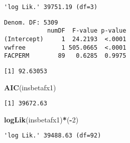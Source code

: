 \documentclass[]{book}
\newenvironment{Shaded}{\begin{snugshade}}{\end{snugshade}}
\newcommand{\CommentTok}[1]{\textcolor[rgb]{0.56,0.35,0.01}{\textit{#1}}}
\newcommand{\DataTypeTok}[1]{\textcolor[rgb]{0.13,0.29,0.53}{#1}}
\newcommand{\DecValTok}[1]{\textcolor[rgb]{0.00,0.00,0.81}{#1}}
\newcommand{\KeywordTok}[1]{\textcolor[rgb]{0.13,0.29,0.53}{\textbf{#1}}}
\newcommand{\NormalTok}[1]{#1}
\newcommand{\OperatorTok}[1]{\textcolor[rgb]{0.81,0.36,0.00}{\textbf{#1}}}
\newcommand{\StringTok}[1]{\textcolor[rgb]{0.31,0.60,0.02}{#1}}
\begin{document}
\begin{verbatim}
'log Lik.' 39751.19 (df=3)
\end{verbatim}

\begin{Shaded}
\end{Shaded}

\begin{verbatim}
Denom. DF: 5309 
            numDF  F-value p-value
(Intercept)     1  24.2193  <.0001
vwfree          1 505.0665  <.0001
FACPERM        89   0.6285  0.9975
\end{verbatim}

\begin{Shaded}
\end{Shaded}

\begin{verbatim}
[1] 92.63053
\end{verbatim}

\begin{Shaded}
\begin{Highlighting}[]
\KeywordTok{AIC}\NormalTok{(insbetafx1)}
\end{Highlighting}
\end{Shaded}

\begin{verbatim}
[1] 39672.63
\end{verbatim}

\begin{Shaded}
\begin{Highlighting}[]
\KeywordTok{logLik}\NormalTok{(insbetafx1)}\OperatorTok{*}\NormalTok{(}\OperatorTok{-}\DecValTok{2}\NormalTok{)}
\end{Highlighting}
\end{Shaded}

\begin{verbatim}
'log Lik.' 39488.63 (df=92)
\end{verbatim}
\end{document}
